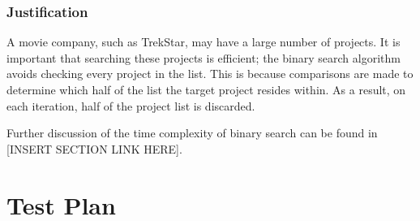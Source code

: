 \documentclass[
  english,
  a4paper,
,tablecaptionabove
]{scrartcl}
\begin{document}
\hypertarget{justification-1}{%
\subsubsection{Justification}\label{justification-1}}

A movie company, such as TrekStar, may have a large number of projects.
It is important that searching these projects is efficient; the binary
search algorithm avoids checking every project in the list. This is
because comparisons are made to determine which half of the list the
target project resides within. As a result, on each iteration, half of
the project list is discarded.

Further discussion of the time complexity of binary search can be found
in {[}INSERT SECTION LINK HERE{]}.

\newpage

\hypertarget{test-plan}{%
\section{Test Plan}\label{test-plan}}
\end{document}
